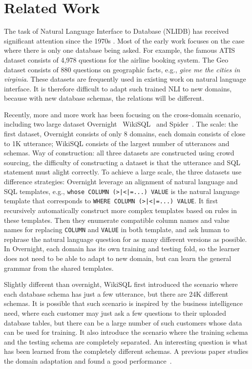 
\section{Related Work}
\label{sec:relwork}

The task of Natural Language Interface to Database (NLIDB) has received significant attention since the 1970s \cite{warren1982efficient,androutsopoulos1993masque,popescu2003towards,hallett2006generic}. Most of the early work focuses on the case where there is only one database being asked. For example, the famous ATIS dataset consists of 4,978 questions for the airline booking system. The Geo dataset consists of 880 questions on geographic facts, e.g., \emph{give me the cities in virginia}. These datasets are frequently used in existing work on natural language interface. It is therefore difficult to adapt such trained NLI to new domains, because with new database schemas, the relations will be different. 

Recently, more and more work has been focusing on the cross-domain scenario, including two large dataset Overnight~\cite{wang2015building} WikiSQL~\cite{zhong2017seq2sql} and Spider~\cite{yu2018spider}. The scale: the first dataset, Overnight consists of only 8 domains, each domain consists of close to 1K utterance; WikiSQL consists of the largest number of utterances and schemas. Way of construction: all three datasets are constructed using crowd sourcing, the difficulty of constructing a dataset is that the utterance and SQL statement must alight correctly. To achieve a large scale, the three datasets use difference strategies: Overnight leverage an alignment of natural language and SQL templates, e.g., \texttt{whose COLUMN (>|<|=...) VALUE} is the natural language template that corresponds to \texttt{WHERE COLUMN (>|<|=...) VALUE}. It first recursively automatically construct more complex templates based on rules in these templates. Then they enumerate compatible column names and value names for replacing \texttt{COLUMN} and \texttt{VALUE} in both template, and ask human to rephrase the natural language question for as many different versions as possible. In Overnight, each domain has its own training and testing fold, so the learner does not need to be able to adapt to new domain, but can learn the general grammar from the shared templates. 

Slightly different than overnight, WikiSQL first introduced the scenario where each database schema has just a few utterance, but there are 24K different schemas. It is possible that such scenario is inspired by the business intelligence need, where each customer may just ask a few questions to their uploaded database tables, but there can be a large number of such customers whose data can be used for training. It also introduce the scenario where the training schema and the testing schema are completely separated. An interesting question is what has been learned from the completely different schemas. A previous paper studies the domain adaptation and found a good performance~\cite{dadashkarimi2018zero}. 

